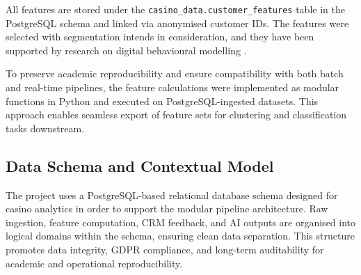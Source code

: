 \documentclass[12pt,a4paper]{report}
\begin{document}
All features are stored under the \texttt{casino\_data.customer\_features} table in the PostgreSQL schema and linked via anonymised customer IDs. The features were selected with segmentation intends in consideration, and they have been supported by research on digital behavioural modelling \citep{Desiata2024b, Omike2022a, randomforest, kmeans}.

To preserve academic reproducibility and ensure compatibility with both batch and real-time pipelines, the feature calculations were implemented as modular functions in Python and executed on PostgreSQL-ingested datasets. This approach enables seamless export of feature sets for clustering and classification tasks downstream.

\subsection{Data Schema and Contextual Model}

The project uses a PostgreSQL-based relational database schema designed for casino analytics in order to support the modular pipeline architecture. Raw ingestion, feature computation, CRM feedback, and AI outputs are organised into logical domains within the schema, ensuring clean data separation. This structure promotes data integrity, GDPR compliance, and long-term auditability for academic and operational reproducibility.
\end{document}
